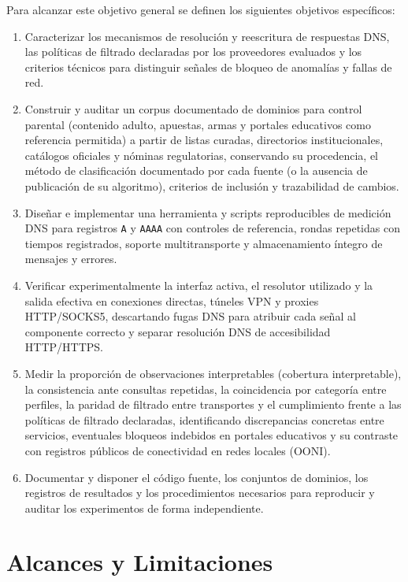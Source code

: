 \documentclass[10pt,a4paper]{article}
\begin{document}
Para alcanzar este objetivo general se definen los siguientes objetivos específicos:
\begin{enumerate}
\item Caracterizar los mecanismos de resolución y reescritura de respuestas DNS, las políticas de filtrado declaradas por los proveedores evaluados y los criterios técnicos para distinguir señales de bloqueo de anomalías y fallas de red.
\item Construir y auditar un corpus documentado de dominios para control parental (contenido adulto, apuestas, armas y portales educativos como referencia permitida) a partir de listas curadas, directorios institucionales, catálogos oficiales y nóminas regulatorias, conservando su procedencia, el método de clasificación documentado por cada fuente (o la ausencia de publicación de su algoritmo), criterios de inclusión y trazabilidad de cambios.
\item Diseñar e implementar una herramienta y scripts reproducibles de medición DNS para registros \texttt{A} y \texttt{AAAA} con controles de referencia, rondas repetidas con tiempos registrados, soporte multitransporte y almacenamiento íntegro de mensajes y errores.
\item Verificar experimentalmente la interfaz activa, el resolutor utilizado y la salida efectiva en conexiones directas, túneles VPN y proxies HTTP/SOCKS5, descartando fugas DNS para atribuir cada señal al componente correcto y separar resolución DNS de accesibilidad HTTP/HTTPS.
\item Medir la proporción de observaciones interpretables (cobertura interpretable), la consistencia ante consultas repetidas, la coincidencia por categoría entre perfiles, la paridad de filtrado entre transportes y el cumplimiento frente a las políticas de filtrado declaradas, identificando discrepancias concretas entre servicios, eventuales bloqueos indebidos en portales educativos y su contraste con registros públicos de conectividad en redes locales (OONI).
\item Documentar y disponer el código fuente, los conjuntos de dominios, los registros de resultados y los procedimientos necesarios para reproducir y auditar los experimentos de forma independiente.
\end{enumerate}

\section{Alcances y Limitaciones}\label{sec:alcances}
\end{document}
